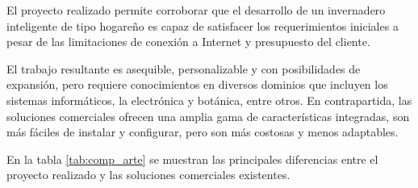 El proyecto realizado permite corroborar que el desarrollo de un invernadero inteligente de tipo hogareño es capaz de satisfacer los requerimientos iniciales a pesar de las limitaciones de conexión a Internet y presupuesto del cliente.   


El trabajo resultante es asequible, personalizable y con posibilidades de expansión, pero requiere conocimientos en diversos dominios que incluyen los sistemas informáticos, la electrónica y botánica, entre otros. En contrapartida, las soluciones comerciales ofrecen una amplia gama de características integradas, son más fáciles de instalar y configurar, pero son más costosas y menos adaptables.

En la tabla \ref{tab:comp_arte} se muestran las principales diferencias entre el proyecto realizado y las soluciones comerciales existentes.


%
%

